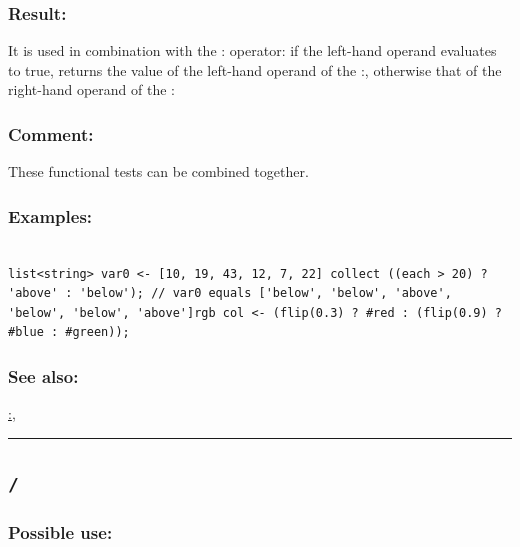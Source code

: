 \documentclass[]{book}
\theoremstyle{definition}
\theoremstyle{definition}
\theoremstyle{definition}
\theoremstyle{remark}
\begin{document}
\subsubsection{Result:}\label{result-4}

It is used in combination with the : operator: if the left-hand operand
evaluates to true, returns the value of the left-hand operand of the :,
otherwise that of the right-hand operand of the :

\subsubsection{Comment:}\label{comment-1}

These functional tests can be combined together.

\subsubsection{Examples:}\label{examples-3}

\begin{verbatim}
 
list<string> var0 <- [10, 19, 43, 12, 7, 22] collect ((each > 20) ? 'above' : 'below'); // var0 equals ['below', 'below', 'above', 'below', 'below', 'above']rgb col <- (flip(0.3) ? #red : (flip(0.9) ? #blue : #green)); 
\end{verbatim}

\subsubsection{See also:}\label{see-also-4}

\href{operators-a-to-a.html\#:}{:},

\begin{center}\rule{0.5\linewidth}{\linethickness}\end{center}

\subsection{\texorpdfstring{\texttt{/}}{/}}\label{section-6}

\subsubsection{Possible use:}\label{possible-use-6}
\end{document}
